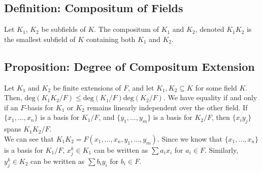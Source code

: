 \documentclass[10pt]{extarticle}
\begin{document}
  \subsection{Definition: Compositum of Fields}%
  Let $K_1$, $K_2$ be subfields of $K$. The compositum of $K_1$ and $K_2$, denoted $K_1K_2$ is the smallest subfield of $K$ containing both $K_1$ and $K_2$.
  \subsection{Proposition: Degree of Compositum Extension}%
  Let $K_1$ and $K_2$ be finite extensions of $F$, and let $K_1,K_2\subseteq K$ for some field $K$. Then, $\text{deg}(K_1K_2/F) \leq \text{deg}(K_1/F)\text{deg}(K_2/F)$. We have equality if and only if an $F$-basis for $K_1$ or $K_2$ remains linearly independent over the other field. If $\{x_1,\dots,x_n\}$ is a basis for $K_1/F$, and $\{y_1,\dots,y_m\}$ is a basis for $K_2/F$, then $\{x_iy_j\}$ spans $K_1K_2/F$.\\

  We can see that $K_1K_2 = F(x_1,\dots,x_n,y_1,\dots,y_m)$. Since we know that $\{x_1,\dots,x_n\}$ is a basis for $K_1/F$, $x_j^k\in K_1$ can be written as $\sum a_ix_i$ for $a_i\in F$. Similarly, $y_j^{k}\in K_2$ can be written as $\sum b_iy_i$ for $b_i\in F$.\\
\end{document}
